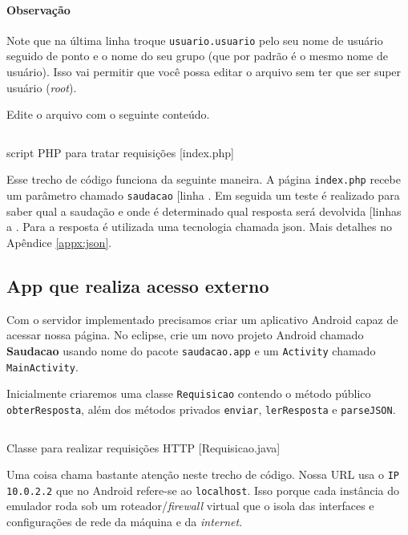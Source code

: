 \paragraph{Observação}

Note que na última linha troque \texttt{usuario.usuario} pelo seu nome
de usuário seguido de ponto e o nome do seu grupo (que por padrão é o
mesmo nome de usuário). Isso vai permitir que você possa editar o
arquivo sem ter que ser super usuário (\emph{root}).

Edite o arquivo com o seguinte conteúdo.

\begin{listing}[H]
  \inputminted[linenos=true,frame=bottomline,tabsize=3]{ php }{ source/index-1.php }
  \caption{script PHP para tratar requisições [index.php]}
\end{listing}

Esse trecho de código funciona da seguinte maneira. A página
\texttt{index.php} recebe um parâmetro chamado \texttt{saudacao}
{[}linha \circled{11}{]}. Em seguida um teste é realizado para saber
qual a saudação e onde é determinado qual resposta será devolvida
{[}linhas  a \circled{22}{]}. Para a resposta é utilizada
uma tecnologia chamada json. Mais detalhes no Apêndice \ref{appx:json}.

\subsection{App que realiza acesso externo}

Com o servidor implementado precisamos criar um aplicativo Android capaz
de acessar nossa página. No eclipse, crie um novo projeto Android
chamado \textbf{Saudacao} usando nome do pacote \texttt{saudacao.app} e
um \texttt{Activity} chamado \texttt{MainActivity}.

Inicialmente criaremos uma classe \texttt{Requisicao} contendo o método
público \texttt{obterResposta}, além dos métodos privados
\texttt{enviar}, \texttt{lerResposta} e \texttt{parseJSON}.

\begin{listing}[H]
  \inputminted[linenos=true,frame=bottomline,tabsize=3]{ java }{ source/Requisicao-1.java }
  \caption{Classe para realizar requisições HTTP [Requisicao.java]}
\end{listing}

Uma coisa chama bastante atenção neste trecho de código. Nossa URL usa o
\texttt{IP 10.0.2.2} que no Android refere-se ao \texttt{localhost}.
Isso porque cada instância do emulador roda sob um
roteador/\emph{firewall} virtual que o isola das interfaces e
configurações de rede da máquina e da \emph{internet}.

